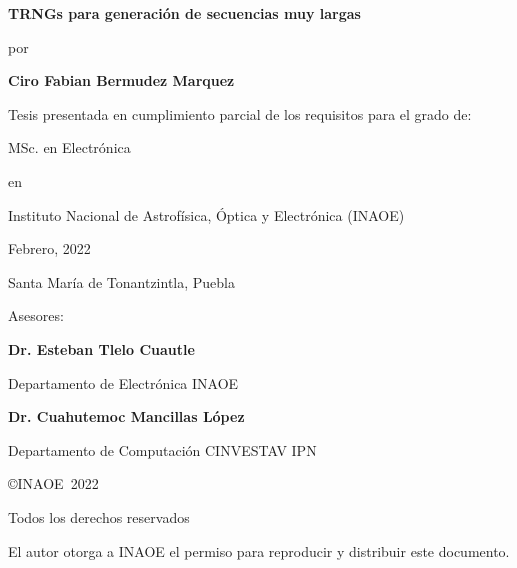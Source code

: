 \documentclass[12pt,a4paper]{report}
\newcommand{\Ptitle}{TRNGs para generación de secuencias muy largas}
\newcommand{\Pauthor}{Ciro Fabian Bermudez Marquez}
\newcommand{\Pdegree}{MSc. en Electrónica}
\newcommand{\Padvisor}{Dr. Esteban Tlelo Cuautle}
\newcommand{\Pcoadvisor}{Dr. Cuahutemoc Mancillas López}
\newcommand{\Pdepartmentadvisor}{Departamento de Electrónica INAOE}
\newcommand{\Pdepartmentcoadvisor}{Departamento de Computación CINVESTAV IPN}
\newcommand{\Pinstitution}{Instituto Nacional de Astrofísica, Óptica y Electrónica (INAOE)}
\newcommand{\Pmonth}{Febrero, }
\newcommand{\Pyear}{2022}
\newcommand{\Paddres}{Santa María de Tonantzintla, Puebla}
\newlength{\vertical}\setlength{\vertical}{0.8cm}
\begin{document}
\begin{titlepage}
 
    \begin{center}
    
        {\Large\bf\Ptitle\par}
        \vspace{\vertical}
        
        {por\par}
        \vspace{\vertical}
        
        {\bf\Pauthor\par}
        \vspace{\vertical}
        
        {Tesis presentada en cumplimiento parcial de los requisitos para el grado de:\par}
        \vspace{\vertical}
        
        {\Pdegree\par}
        \vspace{\vertical}
        
        {en\par}
        \vspace{\vertical}
        
        {\Pinstitution\par}
        \vspace{\vertical}
        
        {\Pmonth\Pyear\par}
        \vspace{\vertical}
    
        {\Paddres\par}        
        \vspace{\vertical}
        
        {Asesores:\par}
        \vspace{\vertical}
        
        {\bf\Padvisor\par}
        {\Pdepartmentadvisor\par}
        \vspace{\vertical}
        
        {\bf\Pcoadvisor\par}
        {\Pdepartmentcoadvisor\par}
        \vspace{\vertical}
        
        {\copyright INAOE~\Pyear\par}
        {Todos los derechos reservados\par}
        {El autor otorga a INAOE el permiso para reproducir y distribuir este documento.\par}
    \end{center}


\end{titlepage}

\end{document}
